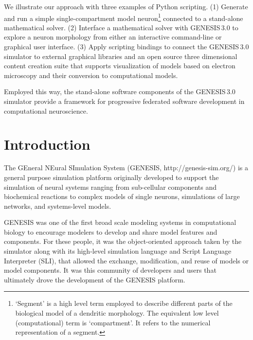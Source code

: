 \documentclass[10pt]{article}
\begin{document}
We illustrate our approach with three examples of Python scripting. 
(1) Generate and run a simple single-compartment model neuron\footnote{`Segment' is a high level term employed to describe different parts of the biological model of a dendritic morphology. The equivalent low level (computational) term is `compartment'. It refers to the numerical representation of a segment.} connected to a 
stand-alone mathematical solver. (2) Interface a mathematical solver with GENESIS\,3.0 to explore a neuron morphology from either
an interactive command-line or graphical user interface.
(3) Apply scripting bindings to connect the GENESIS\,3.0 simulator to
external graphical libraries and an open source three dimensional content creation
suite that supports visualization of models based on electron
microscopy and their conversion to computational
models.

Employed this way, the stand-alone software components of the GENESIS\,3.0 
simulator provide a framework for progressive federated
software development in computational neuroscience.\\


\section*{Introduction}

The GEneral NEural SImulation System (GENESIS,
http://genesis-sim.org/) is a general purpose simulation platform originally
developed to support the simulation of neural systems ranging from
sub-cellular components and biochemical reactions to complex models of
single neurons, simulations of large networks, and systems-level
models.

GENESIS was one of the first broad scale modeling systems in
computational biology to encourage modelers to develop and share model
features and components. For these people, it was the object-oriented
approach taken by the simulator along with its high-level simulation
language and Script Language Interpreter (SLI), that allowed the exchange, modification, and reuse of models
or model components.  It was this community of developers and
 users that ultimately drove the development of the GENESIS platform.
 
\end{document}
